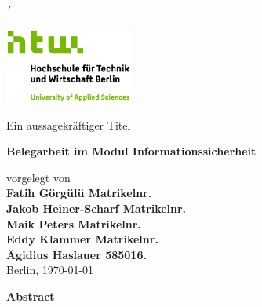 ´\documentclass[
    a4paper,
    pagesize,
    pdftex,
    12pt,
]{scrartcl}
\begin{document}
    \begin{titlepage}
        \begin{center}
            \includegraphics[height=25mm]{S04_HTW_Berlin_Logo_pos_FARBIG_RGB.jpg} \\
            \vspace{1.0cm}

            Ein aussagekräftiger Titel

            \vspace{1.5cm}

            \textbf{Belegarbeit im Modul Informationssicherheit}

            \vspace{1.5cm}

            vorgelegt von \\[0.5cm]
            \textbf{Fatih Görgülü Matrikelnr.} \\
            \textbf{Jakob Heiner-Scharf Matrikelnr.} \\
            \textbf{Maik Peters Matrikelnr.} \\
            \textbf{Eddy Klammer Matrikelnr.} \\
            \textbf{Ägidius Haslauer 585016.} \\


            \vspace{1.5cm}
            Berlin, \today\\
        \end{center}
    \end{titlepage}


    \newpage
    \textbf{Abstract}

    \newpage


    \thispagestyle{empty}
    \tableofcontents
    \newpage


\end{document}
